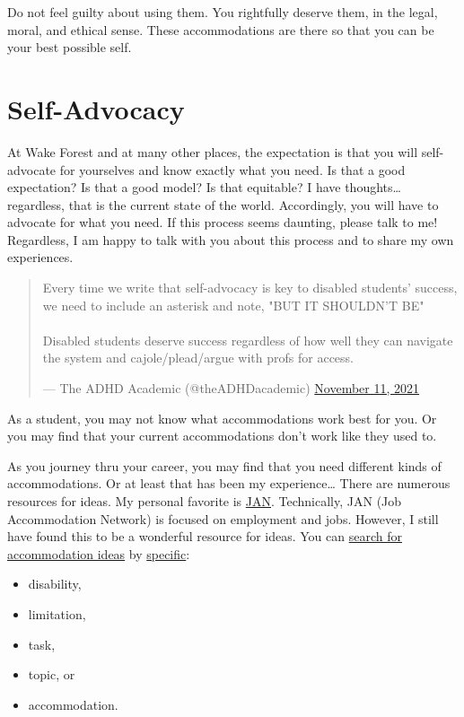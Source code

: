 \documentclass[
]{book}
\providecommand{\tightlist}{%
  \setlength{\itemsep}{0pt}\setlength{\parskip}{0pt}}
\begin{document}
Do not feel guilty about using them.
You rightfully deserve them, in the legal, moral, and ethical sense.
These accommodations are there so that you can be your best possible self.

\hypertarget{self-advocacy}{%
\section{Self-Advocacy}\label{self-advocacy}}

At Wake Forest and at many other places, the expectation is that you will self-advocate for yourselves and know exactly what you need. Is that a good expectation? Is that a good model? Is that equitable? I have thoughts\ldots{} regardless, that is the current state of the world. Accordingly, you will have to advocate for what you need. If this process seems daunting, please talk to me! Regardless, I am happy to talk with you about this process and to share my own experiences.

\begin{quote}
Every time we write that self-advocacy is key to disabled students'
success, we need to include an asterisk and note, "BUT IT SHOULDN'T
BE"\\
~\\
Disabled students deserve success regardless of how well they can
navigate the system and cajole/plead/argue with profs for access.

--- The ADHD Academic (@theADHDacademic) \href{https://twitter.com/theADHDacademic/status/1458876178580881410}{November 11,
2021}
\end{quote}

As a student, you may not know what accommodations work best for you. Or you may find that your current accommodations don't work like they used to.

As you journey thru your career, you may find that you need different kinds of accommodations. Or at least that has been my experience\ldots{} There are numerous resources for ideas.
My personal favorite is \href{https://askjan.org/}{JAN}. Technically, JAN (Job Accommodation Network) is focused on employment and jobs.
However, I still have found this to be a wonderful resource for ideas.
You can \href{https://askjan.org/soar.cfm}{search for accommodation ideas} by \href{https://askjan.org/a-to-z.cfm}{specific}:

\begin{itemize}
\tightlist
\item
  disability,
\item
  limitation,
\item
  task,
\item
  topic, or
\item
  accommodation.
\end{itemize}
\end{document}
